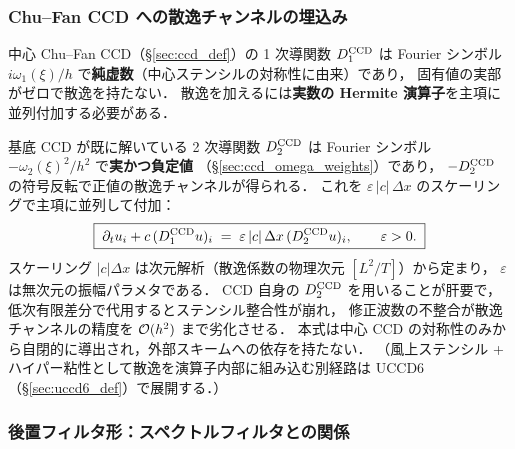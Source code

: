 \subsubsection{Chu--Fan CCD への散逸チャンネルの埋込み}
\label{sec:dccd_embedding}
\label{sec:dccd_modified_eq}%

中心 Chu--Fan CCD（§\ref{sec:ccd_def}）の 1 次導関数 $D_1^{\mathrm{CCD}}$ は
Fourier シンボル $i\omega_1(\xi)/h$ で\textbf{純虚数}（中心ステンシルの対称性に由来）であり，
固有値の実部がゼロで散逸を持たない．
散逸を加えるには\textbf{実数の Hermite 演算子}を主項に並列付加する必要がある．

基底 CCD が既に解いている 2 次導関数 $D_2^{\mathrm{CCD}}$ は
Fourier シンボル $-\omega_2(\xi)^2/h^2$ で\textbf{実かつ負定値}
（§\ref{sec:ccd_omega_weights}）であり，
$-D_2^{\mathrm{CCD}}$ の符号反転で正値の散逸チャンネルが得られる．
これを $\varepsilon\,|c|\,\Delta x$ のスケーリングで主項に並列して付加：
\begin{equation}
  \boxed{\;
  \partial_t u_i + c\,(D_1^{\mathrm{CCD}}u)_i
  \;=\; \varepsilon\,|c|\,\Delta x\,(D_2^{\mathrm{CCD}}u)_i,
  \qquad \varepsilon > 0.
  \;}
  \label{eq:dccd_pde_form}
\end{equation}
スケーリング $|c|\Delta x$ は次元解析（散逸係数の物理次元 $[L^2/T]$）から定まり，
$\varepsilon$ は無次元の振幅パラメタである．
CCD 自身の $D_2^{\mathrm{CCD}}$ を用いることが肝要で，
低次有限差分で代用するとステンシル整合性が崩れ，
修正波数の不整合が散逸チャンネルの精度を $\mathcal{O}(h^2)$ まで劣化させる．
本式は中心 CCD の対称性のみから自閉的に導出され，外部スキームへの依存を持たない．
（風上ステンシル + ハイパー粘性として散逸を演算子内部に組み込む別経路は
UCCD6（§\ref{sec:uccd6_def}）で展開する．）

\subsubsection{後置フィルタ形：スペクトルフィルタとの関係}
\label{sec:dccd_spectral_filter}
\label{sec:dccd_filter_theory}%

